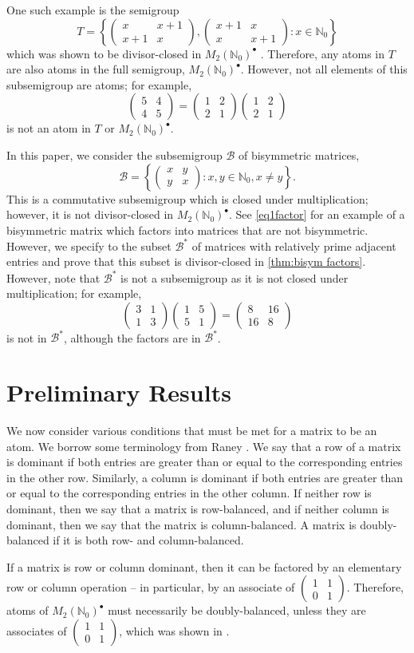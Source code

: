 \documentclass{amsart}
\newcommand{\pmx}[4]{\begin{pmatrix} #1 & #2 \\ #3 & #4 \end{pmatrix}}
\newcommand{\mtwo}{M_2(\mathbb{N}_0)^\bullet}
\newcommand{\B}{\mathcal{B}}
\begin{document}
One such example is the semigroup 
\[T = \left\{\pmx{x}{x+1}{x+1}{x},\pmx{x+1}{x}{x}{x+1}: x\in \mathbb{N}_0\right\}\]
which was shown to be divisor-closed in $\mtwo$ \cite[Prop. 3.10]{Baeth21}. Therefore, any atoms in $T$ are also atoms in the full semigroup, $\mtwo$. However, not all elements of this subsemigroup are atoms; for example,
\[\pmx{5}{4}{4}{5}=\pmx1221 \pmx1221\]
is not an atom in $T$ or $\mtwo$.

In this paper, we  consider the subsemigroup $\B$ of bisymmetric matrices,
\[\B= \left\{\pmx{x}{y}{y}{x}: x,y \in \mathbb{N}_0, x\neq y\right\}.\]
This is a commutative subsemigroup which is closed under multiplication; however, it is not divisor-closed in $\mtwo$. See \eqref{eq1factor}
for an example of a bisymmetric matrix which factors into matrices that are not bisymmetric. However, we specify to the subset $\B^*$ of matrices with relatively prime adjacent entries and prove that this subset is divisor-closed in \cref{thm:bisym factors}. However, note that $\B^*$ is not a subsemigroup as it is not closed under multiplication; for example,
\[\pmx{3}{1}{1}{3} \pmx{1}{5}{5}{1}=\pmx{8}{16}{16}{8}\]
is not in $\B^*$, although the factors are in $\B^*$. 



\section{Preliminary Results}

We  now consider various conditions that must be met for a matrix to be an atom. We borrow some terminology from Raney \cite{Raney73}. We  say that a row of a matrix is dominant if both entries are greater than or equal to the corresponding entries in the other row. Similarly, a column is dominant if both entries are greater than or equal to the corresponding entries in the other column. If neither row is dominant, then we say that a matrix is row-balanced, and if neither column is dominant, then we say that the matrix is column-balanced. A matrix is doubly-balanced if it is both row- and column-balanced.


If a matrix is row or column dominant, then it can be factored by an elementary row or column operation -- in particular, by an associate of $\pmx{1}{1}{0}{1}$. Therefore, atoms of $\mtwo$ must necessarily be doubly-balanced, unless they are associates of $\pmx{1}{1}{0}{1}$, which was shown in \cite{Baeth21}.
\end{document}
